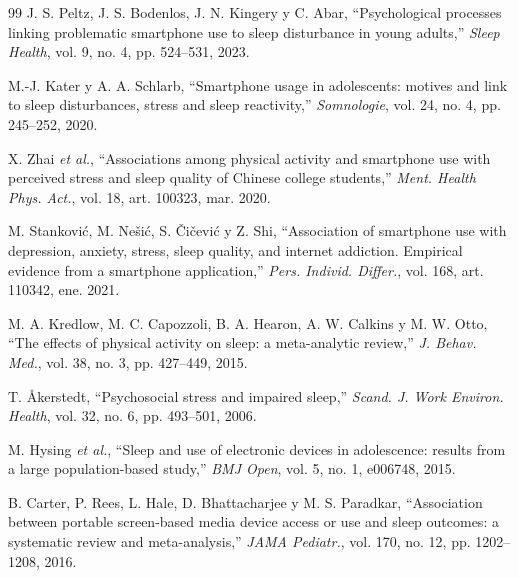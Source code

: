 \documentclass[conference]{IEEEtran}
\begin{document}
\begin{thebibliography}{99}
 J. S. Peltz, J. S. Bodenlos, J. N. Kingery y C. Abar, ``Psychological processes linking problematic smartphone use to sleep disturbance in young adults,'' \emph{Sleep Health}, vol. 9, no. 4, pp. 524--531, 2023.

 M.-J. Kater y A. A. Schlarb, ``Smartphone usage in adolescents: motives and link to sleep disturbances, stress and sleep reactivity,'' \emph{Somnologie}, vol. 24, no. 4, pp. 245--252, 2020.

 X. Zhai \emph{et al.}, ``Associations among physical activity and smartphone use with perceived stress and sleep quality of Chinese college students,'' \emph{Ment. Health Phys. Act.}, vol. 18, art. 100323, mar. 2020.

 M. Stanković, M. Nešić, S. Čičević y Z. Shi, ``Association of smartphone use with depression, anxiety, stress, sleep quality, and internet addiction. Empirical evidence from a smartphone application,'' \emph{Pers. Individ. Differ.}, vol. 168, art. 110342, ene. 2021.

 M. A. Kredlow, M. C. Capozzoli, B. A. Hearon, A. W. Calkins y M. W. Otto, ``The effects of physical activity on sleep: a meta-analytic review,'' \emph{J. Behav. Med.}, vol. 38, no. 3, pp. 427--449, 2015.

 T. Åkerstedt, ``Psychosocial stress and impaired sleep,'' \emph{Scand. J. Work Environ. Health}, vol. 32, no. 6, pp. 493--501, 2006.

 M. Hysing \emph{et al.}, ``Sleep and use of electronic devices in adolescence: results from a large population-based study,'' \emph{BMJ Open}, vol. 5, no. 1, e006748, 2015.

 B. Carter, P. Rees, L. Hale, D. Bhattacharjee y M. S. Paradkar, ``Association between portable screen-based media device access or use and sleep outcomes: a systematic review and meta-analysis,'' \emph{JAMA Pediatr.}, vol. 170, no. 12, pp. 1202--1208, 2016.

\end{thebibliography}
\end{document}
